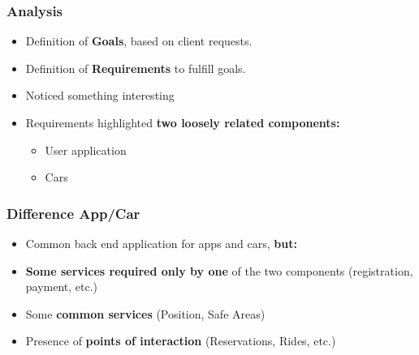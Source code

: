 \begin{frame}
    \frametitle{Analysis}
    \begin{itemize}
        \item Definition of \textbf{Goals}, based on client requests.
            \pause
        \item Definition of \textbf{Requirements} to fulfill goals.
            \pause
        \item Noticed something interesting
            \pause
        \item Requirements highlighted \textbf{two loosely related components:}
            \begin{itemize}
                \item User application
                \item Cars
            \end{itemize}
    \end{itemize}
\end{frame}

\begin{frame}
    \frametitle{Difference App/Car}
    \begin{itemize}
        \item Common back end application for apps and cars, \textbf{but:}
            \pause
        \item \textbf{Some services required only by one} of the two components (registration, payment, etc.)
            \pause
        \item Some \textbf{common services} (Position, Safe Areas)
            \pause
        \item Presence of \textbf{points of interaction} (Reservations, Rides, etc.)
    \end{itemize}
\end{frame}
